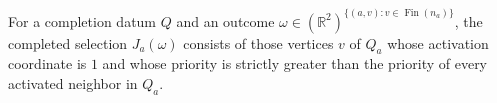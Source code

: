\begin{definition}
For a completion datum $Q$ and an outcome
$\omega\in(\mathbb R^2)^{\{(a,v):v\in\operatorname{Fin}(n_a)\}}$,
the completed selection $J_a(\omega)$ consists of those vertices $v$ of
$Q_a$ whose activation coordinate is $1$ and whose priority is strictly
greater than the priority of every activated neighbor in $Q_a$.
\end{definition}
